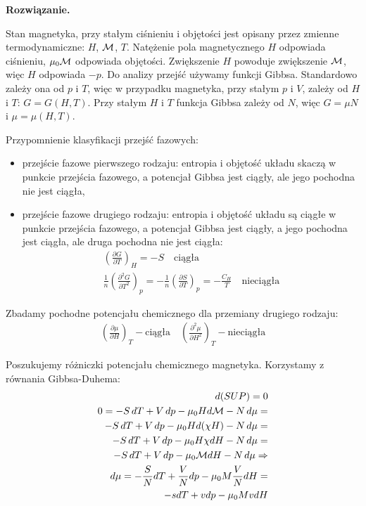\documentclass[11pt,a4paper]{article}
\newenvironment{solution}{\vspace{1cm} \par\textbf{Rozwiązanie.} \vspace{1cm}}{}
\begin{document}
\begin{solution}

Stan magnetyka, przy stałym ciśnieniu i objętości jest opisany przez zmienne 
termodynamiczne: $H$, ${\cal M}$, $T$. Natężenie pola magnetycznego $H$ 
odpowiada ciśnieniu, $\mu_0{\cal M}$ odpowiada objętości.
Zwiększenie $H$ powoduje zwiększenie ${\cal M}$, więc $H$ odpowiada $-p$.
Do analizy przejść używamy funkcji Gibbsa. Standardowo zależy ona od 
$p$ i $T$, więc w przypadku magnetyka, przy stałym $p$ i $V$, zależy od 
$H$ i $T$: $G = G(H,T)$. Przy stałym $H$ i $T$ funkcja Gibbsa zależy od $N$, 
więc $G = \mu N$ i $\mu = \mu(H,T)$.

\vskip 0.2cm

Przypomnienie klasyfikacji przejść fazowych:
\begin{itemize}
  \item przejście fazowe pierwszego rodzaju: 
        entropia i objętość układu skaczą w punkcie przejścia fazowego, 
        a potencjał Gibbsa jest ciągły, ale jego pochodna nie jest ciągła,
  \item przejście fazowe drugiego rodzaju: entropia i objętość układu są 
        ciągłe w punkcie przejścia fazowego, a potencjał Gibbsa jest ciągły, 
        a jego pochodna jest ciągła, ale druga pochodna nie jest ciągła:
        \begin{align*}
          \left( \frac{\partial G}{\partial T} \right)_H = -S \quad \text{ciągła} \\
          \frac{1}{n}\left( \frac{\partial^2 G}{\partial T^2} \right)_p = 
          -\frac{1}{n}\left( \frac{\partial S}{\partial T} \right)_p = 
          -\frac{C_H}{T} \quad \text{nieciągła}
        \end{align*}
\end{itemize}

Zbadamy pochodne potencjału chemicznego dla przemiany drugiego rodzaju:
\begin{align*}
\left( \frac{\partial \mu}{\partial H} \right)_T -  \text{ciągła} \quad
\left( \frac{\partial^{2} \mu}{\partial H^{2}} \right)_T - \text{nieciągła}
\end{align*}

Poszukujemy różniczki potencjału chemicznego magnetyka. Korzystamy z równania 
Gibbsa-Duhema:
\begin{align*}
  d(SUP) = 0 \\
  0 = -S\,dT + V\,dp  - \mu_0 H d {\cal  M}  - N\,d\mu = \\
  -S\,dT + V\,dp -  \mu_0 H d (\chi H) -  N\,d\mu = \\
  -S\,dT + V\,dp -  \mu_0 H \chi dH -  N\,d\mu = \\
  -S\,dT + V\,dp -  \mu_0 {\cal M} dH -  N\,d\mu \Rightarrow \\
  d\mu = -\frac{S}{N} dT + \frac{V}{N} dp - \mu_0 M \frac{V}{N} dH = \\
  - s dT + v dp - \mu_0 M v dH
\end{align*}


\end{solution}
\end{document}
